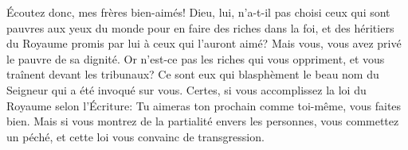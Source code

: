 Écoutez donc, mes frères bien-aimés!
	Dieu, lui, n’a-t-il pas choisi ceux qui sont pauvres aux yeux du monde
	pour en faire des riches dans la foi,
	et des héritiers du Royaume promis par lui à ceux qui l’auront aimé?
	Mais vous, vous avez privé le pauvre de sa dignité.
Or n’est-ce pas les riches qui vous oppriment,
	et vous traînent devant les tribunaux?
Ce sont eux qui blasphèment le beau nom du Seigneur
	qui a été invoqué sur vous.
Certes, si vous accomplissez la loi du Royaume selon l’Écriture:
	Tu aimeras ton prochain comme toi-même,
	vous faites bien.
Mais si vous montrez de la partialité envers les personnes,
	vous commettez un péché, et cette loi vous convainc de transgression.
